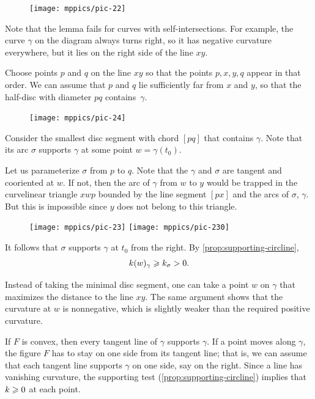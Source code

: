 {

\begin{figure}
\vskip-4mm
\centering
\texttt{[image: mppics/pic-22]}
\vskip0mm
\end{figure}

Note that the lemma fails for curves with self-intersections.
For example, the curve $\gamma$ on the diagram always turns right, 
so it has negative curvature everywhere, but it lies on the right side of the line $xy$.

}

Choose points $p$ and $q$ on the line $xy$
so that the points $p, x, y, q$ appear in that order.
We can assume that $p$ and $q$ lie sufficiently far from $x$ and $y$, so that the half-disc with diameter $pq$ contains~$\gamma$.

\begin{figure}
\vskip-3mm
\centering
\texttt{[image: mppics/pic-24]}
\end{figure}

Consider the smallest disc segment with chord $[pq]$ that contains $\gamma$.
Note that its arc $\sigma$ supports $\gamma$ at some point $w=\gamma(t_0)$.

Let us parameterize $\sigma$ from $p$ to $q$.
Note that the $\gamma$ and $\sigma$ are tangent and cooriented at $w$.
If not, then the arc of $\gamma$ from $w$ to $y$ would be trapped in the curvelinear triangle $xwp$ bounded by the line segment $[px]$ and the arcs of $\sigma$, $\gamma$.
But this is impossible since $y$ does not belong to this triangle.

{

\begin{figure}
\vskip-2mm
\centering
\texttt{[image: mppics/pic-23]}
\bigskip
\texttt{[image: mppics/pic-230]}
\end{figure}

It follows that $\sigma$ supports $\gamma$ at $t_0$ from the right.
By \ref{prop:supporting-circline}, 
\[k(w)_\gamma\geqslant k_\sigma >0.\]
\qedsf

Instead of taking the minimal disc segment, one can take a point $w$ on $\gamma$ that maximizes the distance to the line $xy$.
The same argument shows that the curvature at $w$ is nonnegative, which is slightly weaker than the required positive curvature.

}

If $F$ is convex, then every tangent line of $\gamma$ supports $\gamma$.
If a point moves along $\gamma$, the figure $F$ has to stay on one side from its tangent line;
that is, we can assume that each tangent line supports $\gamma$ on one side, say on the right.
Since a line has vanishing curvature, the supporting test (\ref{prop:supporting-circline}) implies that $k\geqslant 0$ at each point.

